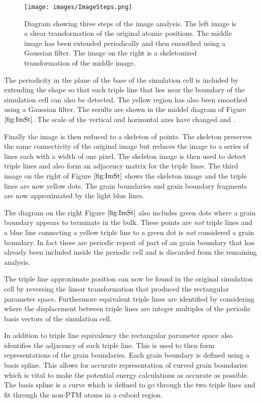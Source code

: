 \documentclass[12pt,a4paper]{book}
\begin{document}
 
\begin{figure}[H]
	\centering
	\texttt{[image: images/ImageSteps.png]} 
	\caption{Diagram showing three steps of the image analysis. The left image is a shear transformation of the original atomic positions. The middle image has been extended periodically and then smoothed using a Gaussian filter. The image on the right is a skeletonized transformation of the middle image.}  
	\label{fig:ImSt}
\end{figure}


The periodicity in the plane of the base of the simulation cell is included by extending the shape so that each triple line that lies near the boundary of the simulation cell can also be detected. The yellow region has also been smoothed using a Gaussian filter. The results are shown in the middel diagram of Figure $\ref{fig:ImSt}$. The scale of the vertical and horizontal axes have changed and . 

Finally the image is then reduced to a skeleton of points. The skeleton preserves the same connectivity of the original image but reduces the image to a series of lines each with a width of one pixel. The skeleton image is then used to detect triple lines and also form an adjacency matrix for the triple lines. The third image on the right of Figure $\ref{fig:ImSt}$ shows the skeleton image and the triple lines are now yellow dots. The grain boundaries and grain boundary fragments are now approximated by the light blue lines.

The diagram on the right Figure $\ref{fig:ImSt}$ also includes green dots  where a grain boundary appears to terminate in the bulk. These points are \emph{not} triple lines and a blue line connecting a yellow triple line to a green dot is \emph{not} considered a grain boundary. In fact these are periodic repeat of part of an grain boundary that has already been included inside the periodic cell and is discarded from the remaining analysis.

The triple line approximate position can now be found in the original simulation cell by reversing the linear transformation that produced the rectangular parameter space. Furthermore equivalent triple lines are identified by considering where the displacement between triple lines are integer multiples of the periodic basis vectors of the simulation cell.

In addition to triple line equivalency the rectangular parameter space also identifies the adjacency of each triple line. This is used to then form representations of the grain boundaries. Each grain boundary is defined using a basis spline. This allows for accurate representation of curved grain boundaries which is vital to make the potential energy calculations as accurate as possible. The basis spline is a curve which is defined to go through the two triple lines and fit through the non-PTM atoms in a cuboid region.  
\end{document}
